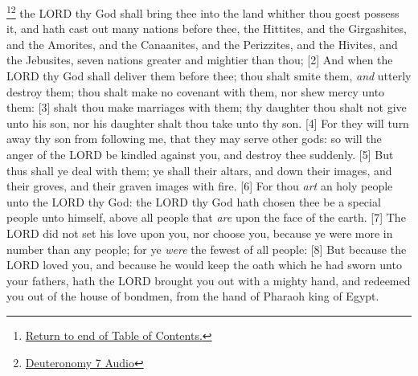 \footnote{\textcolor[cmyk]{0.99998,1,0,0}{\hyperlink{TOC}{Return to end of Table of Contents.}}}\footnote{\href{https://audiobible.com/bible/deuteronomy_7.html}{\textcolor[cmyk]{0.99998,1,0,0}{Deuteronomy 7 Audio}}}\textcolor[cmyk]{0.99998,1,0,0}{ the LORD thy God shall bring thee into the land whither thou goest possess it, and hath cast out many nations before thee, the Hittites, and the Girgashites, and the Amorites, and the Canaanites, and the Perizzites, and the Hivites, and the Jebusites, seven nations greater and mightier than thou;}\marginpar{\scriptsize \textcolor[rgb]{0.00,0.545,0.269}{$\rightarrow$The List of 7 nations: 
\begin{compactenum}
	\item Hittites
	\item Girgashites
	\item Amorites
	\item Canaanites
	\item Perizzites
	\item Hivites
	\item Jebusites
\end{compactenum}}}
[2] \textcolor[cmyk]{0.99998,1,0,0}{And when the LORD thy God shall deliver them before thee; thou shalt smite them, \emph{and} utterly destroy them; thou shalt make no covenant with them, nor shew mercy unto them:}
[3] \textcolor[cmyk]{0.99998,1,0,0}{ shalt thou make marriages with them; thy daughter thou shalt not give unto his son, nor his daughter shalt thou take unto thy son.}
[4] \textcolor[cmyk]{0.99998,1,0,0}{For they will turn away thy son from following me, that they may serve other gods: so will the anger of the LORD be kindled against you, and destroy thee suddenly.}
[5] \textcolor[cmyk]{0.99998,1,0,0}{But thus shall ye deal with them; ye shall  their altars, and  down their images, and  their groves, and  their graven images with fire.}
[6] \textcolor[cmyk]{0.99998,1,0,0}{For thou \emph{art} an holy people unto the LORD thy God: the LORD thy God hath chosen thee be a special people unto himself, above all people that \emph{are} upon the face of the earth.}
[7] \textcolor[cmyk]{0.99998,1,0,0}{The LORD did not set his love upon you, nor choose you, because ye were more in number than any people; for ye \emph{were} the fewest of all people:}
[8] \textcolor[cmyk]{0.99998,1,0,0}{But because the LORD loved you, and because he would keep the oath which he had sworn unto your fathers, hath the LORD brought you out with a mighty hand, and redeemed you out of the house of bondmen, from the hand of Pharaoh king of Egypt.}
